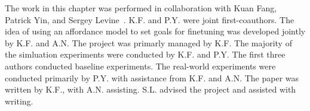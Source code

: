 The work in this chapter was performed in collaboration with Kuan Fang, Patrick Yin, and Sergey Levine~\citep{fang2022ptp}. K.F. and P.Y. were joint first-coauthors. The idea of using an affordance model to set goals for finetuning was developed jointly by K.F. and A.N. The project was primarly managed by K.F. The majority of the simluation experiments were conducted by K.F. and P.Y. The first three authors conducted baseline experiments. The real-world experiments were conducted primarily by P.Y. with assistance from K.F. and A.N. The paper was written by K.F., with A.N. assisting. S.L. advised the project and assisted with writing.


% 
% 


% 
